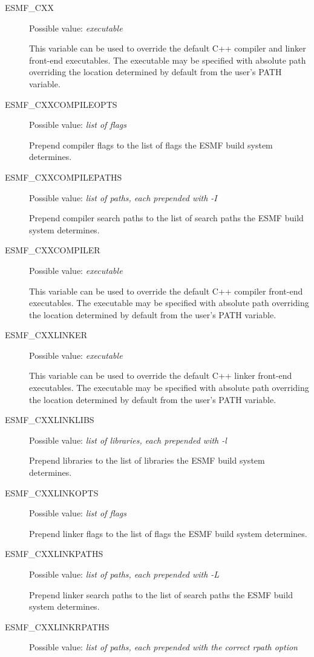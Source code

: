\begin{description}
\item[ESMF\_CXX]
Possible value: {\em executable}

This variable can be used to override the default C++ compiler and linker
front-end executables. The executable may be specified with absolute path
overriding the location determined by default from the user's PATH variable.

\item[ESMF\_CXXCOMPILEOPTS]
Possible value: {\em list of flags}

Prepend compiler flags to the list of flags the ESMF build system determines.

\item[ESMF\_CXXCOMPILEPATHS]
Possible value: {\em list of paths, each prepended with -I}

Prepend compiler search paths to the list of search paths the ESMF build system
determines.

\item[ESMF\_CXXCOMPILER]
Possible value: {\em executable}

This variable can be used to override the default C++ compiler
front-end executables. The executable may be specified with absolute path
overriding the location determined by default from the user's PATH variable.

\item[ESMF\_CXXLINKER]
Possible value: {\em executable}

This variable can be used to override the default C++ linker
front-end executables. The executable may be specified with absolute path
overriding the location determined by default from the user's PATH variable.

\item[ESMF\_CXXLINKLIBS]
Possible value: {\em list of libraries, each prepended with -l}

Prepend libraries to the list of libraries the ESMF build system determines.

\item[ESMF\_CXXLINKOPTS]
Possible value: {\em list of flags}

Prepend linker flags to the list of flags the ESMF build system determines.

\item[ESMF\_CXXLINKPATHS]
Possible value: {\em list of paths, each prepended with -L}

Prepend linker search paths to the list of search paths the ESMF build system
determines.

\item[ESMF\_CXXLINKRPATHS]
Possible value: {\em list of paths, each prepended with the correct rpath option}


\end{description}
